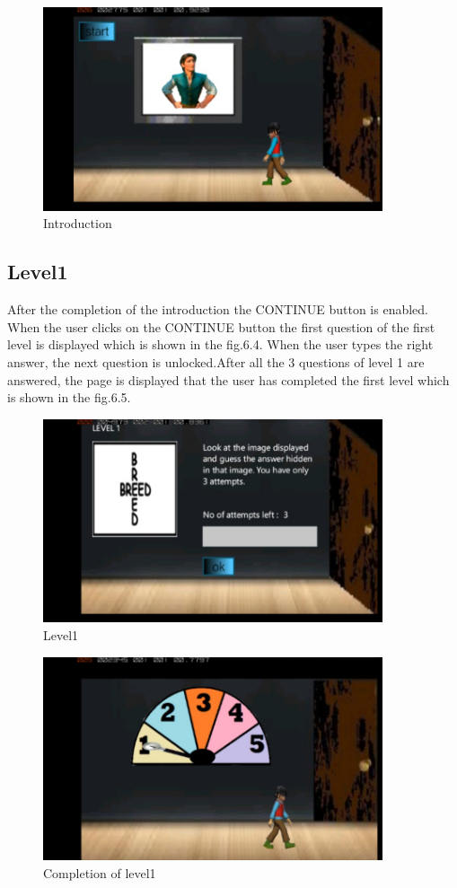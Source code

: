 \begin{figure}[htbp]
	\centering
	\includegraphics[width=10cm,height=6cm]{3.jpg}
	\caption{Introduction}
\end{figure}

\vspace{6cm}





\subsection{Level1}
\hspace{1cm}After the completion of the introduction the CONTINUE button is enabled.
When the user clicks on the CONTINUE button the first question of the first level
is displayed which is shown in the fig.6.4. When the user types the right answer, the next question is unlocked.After all the 3 questions of level 1 are answered, the page is displayed that the user  has completed the first level which is shown in the fig.6.5.


\begin{figure}[htbp]
	\centering
	\includegraphics[width=10cm,height=6cm]{4.jpg}
	\caption{Level1}
\end{figure}

\begin{figure}[htbp]
	\centering
	\includegraphics[width=10cm,height=6cm]{5.jpg}
	\caption{Completion of level1}
\end{figure}

